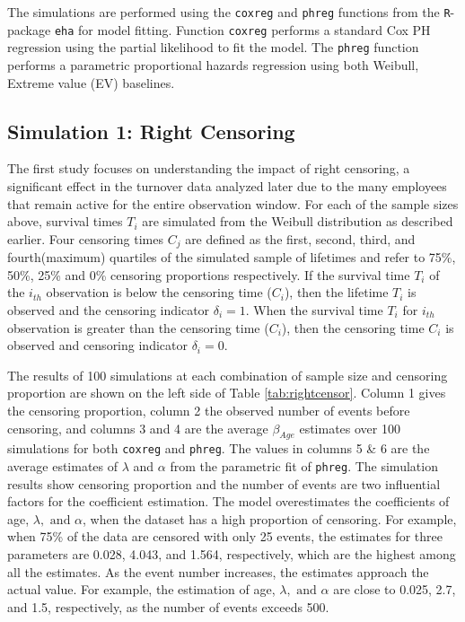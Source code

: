 \documentclass[12pt,letterpaper]{article}
\begin{document}
The simulations are performed using the {\tt coxreg} and {\tt phreg} functions from the {\tt R}-package {\tt eha} \citep{eha} for model fitting.  Function {\tt coxreg} performs a standard Cox PH regression using the partial likelihood to fit the model.  The {\tt phreg} function performs a parametric proportional hazards regression using both Weibull, Extreme value (EV) baselines.



\subsection{Simulation 1: Right Censoring}

The first study focuses on understanding the impact of right censoring, a significant effect in the turnover data analyzed later due to the many employees that remain active for the entire observation window. For each of the sample sizes above, survival times $T_i$ are simulated from the Weibull distribution as described earlier.  Four censoring times $C_j$ are defined as the first, second, third, and fourth(maximum) quartiles of the simulated sample of lifetimes and refer to 75\%, 50\%, 25\% and 0\% censoring proportions respectively. If the survival time $T_i$ of the $i_{th}$ observation is below the censoring time ($C_i$), then the lifetime $T_i$ is observed and the censoring indicator $\delta_i=1$. When the survival time $T_i$ for $i_{th}$ observation is greater than the censoring time ($C_i$), then the censoring time $C_i$ is observed and censoring indicator $\delta_i = 0$.

The results of 100 simulations at each combination of sample size and censoring proportion are shown on the left side of Table \ref{tab:rightcensor}. Column 1 gives the censoring proportion, column 2 the observed number of events before censoring, and columns 3 and 4 are the average $\beta_{Age}$ estimates over 100 simulations for both {\tt coxreg} and {\tt phreg}.  The values in columns 5 \& 6  are the average estimates of $\lambda$ and $\alpha$ from the parametric fit of {\tt phreg}. The simulation results show censoring proportion and the number of events are two influential factors for the coefficient estimation. The model overestimates the coefficients of age, $\lambda, \text{ and } \alpha$, when the dataset has a high proportion of censoring. For example, when 75\% of the data are censored with only 25 events, the estimates for three parameters are 0.028, 4.043, and 1.564, respectively, which are the highest among all the estimates. As the event number increases, the estimates approach the actual value. For example, the estimation of age, $\lambda, \text{ and } \alpha$ are close to 0.025, 2.7, and 1.5, respectively, as the number of events exceeds 500.
\end{document}
